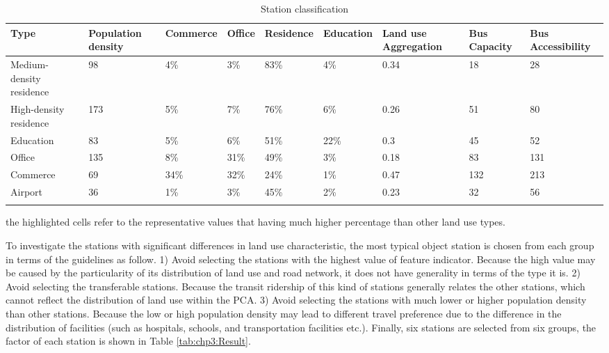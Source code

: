 \begin{sidewaystable}[htbp]
	\centering
	\caption{Station classification}
	\label{tab:chp3:StationClassification}
	\small
	\renewcommand{\arraystretch}{1.25} %
	\begin{tabular}{p{12em}<{\centering}p{4em}<{\centering}p{4em}<{\centering}p{4em}<{\centering}p{4em}<{\centering}p{4em}<{\centering}p{5em}<{\centering}p{5em}<{\centering}p{5em}<{\centering}}
		
		\Xhline{1.5pt}
		Type & Population density & Commerce & Office & Residence & Education & Land use Aggregation & Bus Capacity & Bus Accessibility \\
		\midrule
		
		Medium-density residence & 98 & 4\% & 3\% & \cellcolor[rgb]{.8, .8, .8} 83\% & 4\% & 0.34 & 18 & 28 \\
		High-density residence & 173 & 5\% & 7\% & \cellcolor[rgb]{.8, .8, .8} 76\% & 6\% & 0.26 & 51 & 80 \\
		Education & 83 & 5\% & 6\% & 51\% & \cellcolor[rgb]{.8, .8, .8} 22\% & 0.3 & 45 & 52 \\
		Office & 135 & 8\% & \cellcolor[rgb]{.8, .8, .8} 31\% & 49\% & 3\% & 0.18 & 83 & 131 \\
		Commerce & 69 & \cellcolor[rgb]{.8, .8, .8} 34\% & \cellcolor[rgb]{.8, .8, .8} 32\% & 24\% & 1\% & 0.47 & 132 & 213 \\
		Airport & 36 & 1\% & 3\% & 45\% & 2\% & 0.23 & 32 & 56 \\
		\Xhline{1.5pt}
		
	\end{tabular}
	\begin{description}
		\label{note:tab:chp3:StationClassification}
		\item[Note:] the highlighted cells refer to the representative values that having much higher percentage than other land use types.
	\end{description}
	
\end{sidewaystable}

%
To investigate the stations with significant differences in land use characteristic, the most typical object station is chosen from each group in terms of the guidelines as follow. 1) Avoid selecting the stations with the highest value of feature indicator. Because the high value may be caused by the particularity of its distribution of land use and road network, it does not have generality in terms of the type it is. 2) Avoid selecting the transferable stations. Because the transit ridership of this kind of stations generally relates the other stations, which cannot reflect the distribution of land use within the PCA. 3) Avoid selecting the stations with much lower or higher population density than other stations. Because the low or high population density may lead to different travel preference due to the difference in the distribution of facilities (such as hospitals, schools, and transportation facilities etc.). Finally, six stations are selected from six groups, the factor of each station is shown in Table \ref{tab:chp3:Result}.

